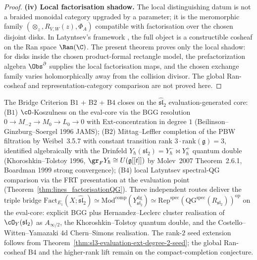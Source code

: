 \begin{proof}
\medskip
\noindent\textbf{(iv) Local factorisation shadow.}
The local distinguishing datum is not a braided monoidal category
upgraded by a parameter; it is the meromorphic family
\((\otimes_z,R_{V,W}(z),\Phi_A)\) compatible with factorisation over
the chosen disjoint disks. In Latyntsev's framework \cite{Lat23}, the
full object is a constructible cosheaf on the Ran space \(\Ran(\C)\).
The present theorem proves only the local shadow: for disks inside the
chosen product-formal rectangle model, the prefactorization algebra
\(\Obs^\partial\) supplies the local factorisation maps, and the chosen
exchange family varies holomorphically away from the collision divisor.
The global Ran-cosheaf and representation-category comparison are not
proved here.
\end{proof}

\begin{corollary}
\label{cor:dk5-sl2-eval-core-closure}
The Bridge Criterion B$1$ + B$2$ + B$4$ closes on the
$\widehat{\mathfrak{sl}}_2$ evaluation-generated core:
\textup{(}B$1$\textup{)} $\cO$-Koszulness on the eval-core via the BGG
resolution $0 \to M_{-2} \to M_0 \to L_0 \to 0$ with Ext-concentration
in degree $1$ \textup{(}Beilinson--Ginzburg--Soergel 1996 JAMS\textup{)};
\textup{(}B$2$\textup{)} Mittag--Leffler completion of the PBW
filtration by Weibel~3.5.7 with constant transition rank
$3 \cdot \mathrm{rank}(\mathfrak g) = 3$, identified algebraically
with the Drinfeld $Y_\hbar(\mathfrak{sl}_2) = Y_\hbar^- \bowtie Y_\hbar^+$
quantum double \textup{(}Khoroshkin--Tolstoy 1996, $\gr_F Y_\hbar \cong U(\mathfrak g[[t]])$
by Molev~2007 Theorem~2.6.1, Boardman 1999 strong convergence\textup{)};
\textup{(}B$4$\textup{)} local Latyntsev spectral-QG comparison via
the FRT presentation at the evaluation point
\textup{(}Theorem~\ref{thm:lines_factorisationQG}\textup{)}.
Three independent routes deliver the triple bridge
$\mathrm{Fact}_{E_1}(X; \widehat{\mathfrak{sl}}_2)
\simeq \mathrm{Mod}^{\mathrm{comp}}(Y^{\mathrm{dg}}_{\mathfrak{sl}_2})
\simeq \mathrm{Rep}^{\mathrm{spec}}(\mathrm{QG}^{\mathrm{spec}}(R_{\mathfrak{sl}_2}))^{\mathrm{op}}$
on the eval-core: explicit BGG plus Hernandez--Leclerc cluster
realisation of $\cO_Y(\mathfrak{sl}_2)$ as $A_{\infty/2}$, the
Khoroshkin--Tolstoy quantum double, and the Costello--Witten--Yamazaki
$4$d Chern--Simons realisation. The rank-$2$ seed extension follows
from Theorem~\ref{thm:sl3-evaluation-ext-degree-2-seed}; the global
Ran-cosheaf B$4$ and the higher-rank lift remain
\ClaimStatusConditional{} on the compact-completion conjecture.
\end{corollary}

